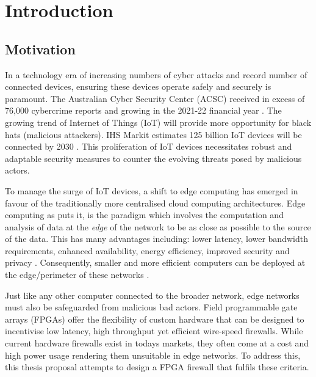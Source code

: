 \chapter[Introduction]{Introduction}
\label{Chap:Intro}



\section{Motivation}


In a technology era of increasing numbers of cyber attacks and record number of connected devices, ensuring these devices operate safely and securely is 
paramount. The Australian Cyber Security Center (ACSC) received in 
excess of 76,000 cybercrime reports and growing in the 2021-22 financial year \cite{acsc_2022}. The growing trend of Internet of Things (IoT) will provide 
more opportunity for black hats (malicious attackers). IHS Markit estimates 125 billion IoT devices will be connected by 2030 \cite{IHS_iot}.
This proliferation of IoT devices necessitates robust and adaptable security measures to counter the evolving threats posed by malicious actors. 

To manage the surge of IoT devices, a shift to edge computing has emerged in favour of the traditionally more centralised cloud computing 
architectures. Edge computing as \cite{EdgeComputing} puts it, is the paradigm which involves the computation and analysis of data 
at the \textit{edge} of the network to be as close as possible to the source of the data. This has many advantages including: lower latency, lower bandwidth requirements,
enhanced availability, energy efficiency, improved security and privacy \cite{EdgeComputing}. Consequently, smaller and more efficient computers can be deployed 
at the edge/perimeter of these networks \cite{EdgeComputingPerspectives}. 

Just like any other computer connected to the broader network, edge networks 
must also be safeguarded from malicious bad actors. Field programmable gate arrays (FPGAs) offer the flexibility of custom hardware that can be designed to incentivise low latency, high throughput yet efficient wire-speed firewalls. While current hardware firewalls exist in todays markets, they often come at a cost and high power usage rendering them unsuitable in edge networks. To address this, this thesis proposal attempts to design a FPGA firewall that fulfils these criteria.

